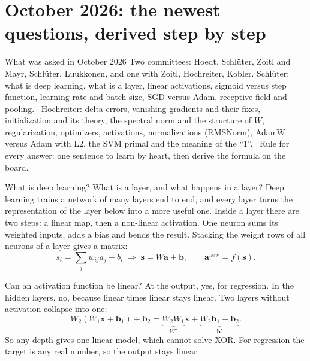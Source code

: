 \section{October 2026: the newest questions, derived step by step}

\begin{summary}{What was asked in October 2026}
Two committees: Hoedt, Schlüter, Zoitl and Mayr, Schlüter, Luukkonen, and one with Zoitl, Hochreiter, Kobler.
\textsf{Schlüter:} what is deep learning, what is a layer, linear activations, sigmoid versus step function,
learning rate and batch size, SGD versus Adam, receptive field and pooling. \
\textsf{Hochreiter:} delta errors, vanishing gradients and their fixes, initialization and its theory, the spectral
norm and the structure of $W$, regularization, optimizers, activations, normalizations (RMSNorm), AdamW versus
Adam with L2, the SVM primal and the meaning of the ``1''. \
\textsf{Rule for every answer:} one sentence to learn by heart, then derive the formula on the board.
\end{summary}

\begin{qabox}[Schlüter]{\asked What is deep learning? What is a layer, and what happens in a layer?}
\ans Deep learning trains a network of many layers end to end, and every layer turns the representation of
the layer below into a more useful one. Inside a layer there are two steps: a linear map, then a non-linear
activation.
\formula One neuron sums its weighted inputs, adds a bias and bends the result. Stacking the weight rows of all
neurons of a layer gives a matrix:
\[ s_i=\sum_j w_{ij}a_j+b_i \;\Longrightarrow\; \mathbf{s}=W\mathbf{a}+\mathbf{b},\qquad \mathbf{a}^{\text{new}}=f(\mathbf{s}). \]
\end{qabox}

\begin{qabox}[Schlüter]{\asked Can an activation function be linear?}
\ans At the output, yes, for regression. In the hidden layers, no, because linear times linear stays linear.
\formula Two layers without activation collapse into one:
\[ W_2(W_1\mathbf{x}+\mathbf{b}_1)+\mathbf{b}_2=\underbrace{W_2W_1}_{W'}\mathbf{x}+\underbrace{W_2\mathbf{b}_1+\mathbf{b}_2}_{\mathbf{b}'}. \]
So any depth gives one linear model, which cannot solve XOR. For regression the target is any real number, so
the output stays linear.
\end{qabox}

